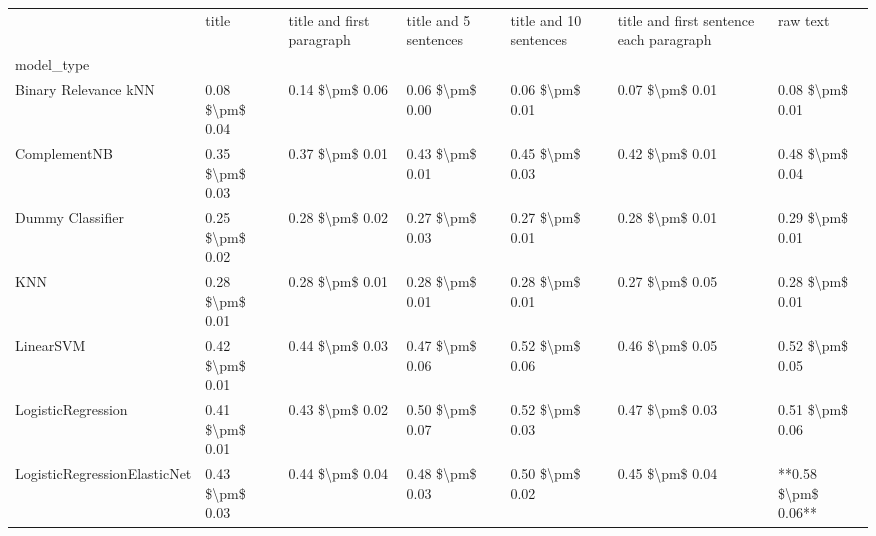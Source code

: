 \begin{tabular}{lllllll}
\toprule
{} &            title & title and first paragraph & title and 5 sentences & title and 10 sentences & title and first sentence each paragraph &             raw text \\
model\_type                      &                  &                           &                       &                        &                                         &                      \\
\midrule
Binary Relevance kNN            &  0.08 \$\textbackslash pm\$ 0.04 &           0.14 \$\textbackslash pm\$ 0.06 &       0.06 \$\textbackslash pm\$ 0.00 &        0.06 \$\textbackslash pm\$ 0.01 &                         0.07 \$\textbackslash pm\$ 0.01 &      0.08 \$\textbackslash pm\$ 0.01 \\
ComplementNB                    &  0.35 \$\textbackslash pm\$ 0.03 &           0.37 \$\textbackslash pm\$ 0.01 &       0.43 \$\textbackslash pm\$ 0.01 &        0.45 \$\textbackslash pm\$ 0.03 &                         0.42 \$\textbackslash pm\$ 0.01 &      0.48 \$\textbackslash pm\$ 0.04 \\
Dummy Classifier                &  0.25 \$\textbackslash pm\$ 0.02 &           0.28 \$\textbackslash pm\$ 0.02 &       0.27 \$\textbackslash pm\$ 0.03 &        0.27 \$\textbackslash pm\$ 0.01 &                         0.28 \$\textbackslash pm\$ 0.01 &      0.29 \$\textbackslash pm\$ 0.01 \\
KNN                             &  0.28 \$\textbackslash pm\$ 0.01 &           0.28 \$\textbackslash pm\$ 0.01 &       0.28 \$\textbackslash pm\$ 0.01 &        0.28 \$\textbackslash pm\$ 0.01 &                         0.27 \$\textbackslash pm\$ 0.05 &      0.28 \$\textbackslash pm\$ 0.01 \\
LinearSVM                       &  0.42 \$\textbackslash pm\$ 0.01 &           0.44 \$\textbackslash pm\$ 0.03 &       0.47 \$\textbackslash pm\$ 0.06 &        0.52 \$\textbackslash pm\$ 0.06 &                         0.46 \$\textbackslash pm\$ 0.05 &      0.52 \$\textbackslash pm\$ 0.05 \\
LogisticRegression              &  0.41 \$\textbackslash pm\$ 0.01 &           0.43 \$\textbackslash pm\$ 0.02 &       0.50 \$\textbackslash pm\$ 0.07 &        0.52 \$\textbackslash pm\$ 0.03 &                         0.47 \$\textbackslash pm\$ 0.03 &      0.51 \$\textbackslash pm\$ 0.06 \\
LogisticRegressionElasticNet    &  0.43 \$\textbackslash pm\$ 0.03 &           0.44 \$\textbackslash pm\$ 0.04 &       0.48 \$\textbackslash pm\$ 0.03 &        0.50 \$\textbackslash pm\$ 0.02 &                         0.45 \$\textbackslash pm\$ 0.04 &  **0.58 \$\textbackslash pm\$ 0.06** \\

\end{tabular}
